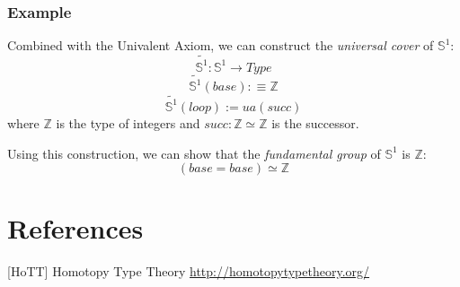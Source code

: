 \documentclass{beamer}
\begin{document}
\begin{frame}
  \frametitle{Example}
  Combined with the Univalent Axiom,
  we can construct the {\it universal cover} of ${\mathbb S}^1$:
  $$
    \widetilde{ {\mathbb S}^1 } : {\mathbb S}^1 \to Type
  $$
  $$
    \widetilde{ {\mathbb S}^1 } \left( base \right) :\equiv {\mathbb Z}
  $$
  $$
    \widetilde{ {\mathbb S}^1 } \left( loop \right) := ua \left( succ \right)
  $$
  where ${\mathbb Z}$ is the type of integers
  and $succ : {\mathbb Z} \simeq {\mathbb Z}$ is the successor.

  Using this construction, we can show that
  the {\it fundamental group} of ${\mathbb S}^1$ is ${\mathbb Z}$:
  $$
  \left( base = base \right) \simeq {\mathbb Z}
  $$
\end{frame}

\section{References}

\begin{thebibliography}{99}
[HoTT]
  Homotopy Type Theory
  \url{http://homotopytypetheory.org/}
\end{thebibliography}
\end{document}
